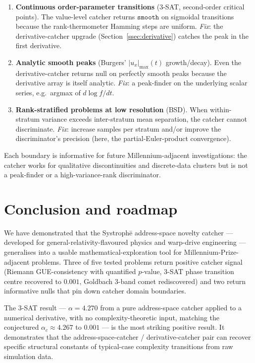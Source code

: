 \documentclass[11pt,letterpaper]{article}
\newcommand{\Systrophe}{Systroph\=e}
\begin{document}
\begin{enumerate}[leftmargin=*,itemsep=2pt]
\item \textbf{Continuous order-parameter transitions} (3-SAT, second-order critical points). The value-level catcher returns $\mathtt{smooth}$ on sigmoidal transitions because the rank-thermometer Hamming steps are uniform. \emph{Fix}: the derivative-catcher upgrade (Section~\ref{ssec:derivative}) catches the peak in the first derivative.
\item \textbf{Analytic smooth peaks} (Burgers' $|u_x|_{\max}(t)$ growth/decay). Even the derivative-catcher returns null on perfectly smooth peaks because the derivative array is itself analytic. \emph{Fix}: a peak-finder on the underlying scalar series, e.g.\ argmax of $d\log f / dt$.
\item \textbf{Rank-stratified problems at low resolution} (BSD). When within-stratum variance exceeds inter-stratum mean separation, the catcher cannot discriminate. \emph{Fix}: increase samples per stratum and/or improve the discriminator's precision (here, the partial-Euler-product convergence).
\end{enumerate}

Each boundary is informative for future Millennium-adjacent investigations: the catcher works for qualitative discontinuities and discrete-data clusters but is not a peak-finder or a high-variance-rank discriminator.

\section{Conclusion and roadmap}\label{sec:concl}

We have demonstrated that the \Systrophe{} address-space novelty catcher --- developed for general-relativity-flavoured physics and warp-drive engineering --- generalises into a usable mathematical-exploration tool for Millennium-Prize-adjacent problems. Three of five tested problems return positive catcher signal (Riemann GUE-consistency with quantified $p$-value, 3-SAT phase transition centre recovered to $0.001$, Goldbach 3-band comet rediscovered) and two return informative nulls that pin down catcher domain boundaries.

The 3-SAT result --- $\alpha = 4.270$ from a pure address-space catcher applied to a numerical derivative, with no complexity-theoretic input, matching the conjectured $\alpha_c \approx 4.267$ to $0.001$ --- is the most striking positive result. It demonstrates that the address-space-catcher / derivative-catcher pair can recover specific structural constants of typical-case complexity transitions from raw simulation data.
\end{document}
